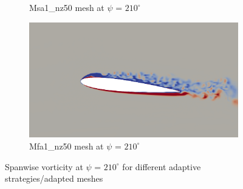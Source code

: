 \begin{figure}[H]
\begin{subfigure}[b]{0.475\textwidth}
\caption{Msa1\_nz50 mesh at $\psi$ = $210^\circ$}
\label{fig:hadapt_psi210}
\end{subfigure}
\begin{subfigure}[b]{0.475\textwidth}
\centering
\includegraphics[width=1\textwidth]{figures/adapt_strat/vorticity_plots/Mfa1_50/phase_210.png}
\caption{Mfa1\_nz50 mesh at $\psi$ = $210^\circ$}
\label{fig:FB_psi210}
\end{subfigure}
\caption{Spanwise vorticity at $\psi$ = $210^\circ$ for different adaptive strategies/adapted meshes}
\label{fig:vorticity_210}
\end{figure}




